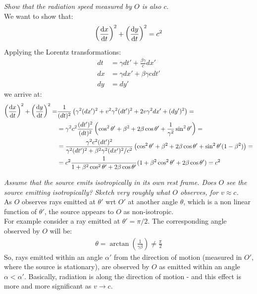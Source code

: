 \documentclass[../template.tex]{subfiles}
\begin{document}
\textit{Show that the radiation speed measured by $O$ is also $c$}.\\

We want to show that:
\begin{align*}
    \left(\dv{x}{t} \right)^2 + \left(\dv{y}{t} \right)^2 = c^2
\end{align*}
Applying the Lorentz transformations:
\begin{align*}
    dt &= \gamma dt' + \frac{\beta \gamma}{c} dx' \\
    dx &= \gamma dx' + \beta \gamma c dt' \\
    dy &= dy'
\end{align*}
we arrive at:
\begin{align*}
    \left(\dv{x}{t} \right)^2 + \left(\dv{y}{t} \right)^2 = &\frac{1}{(dt)^2} \left(\gamma^2 (dx')^2 + v^2 \gamma^2 (dt')^2 + 2v \gamma^2 dx' + (dy')^2\right) =\\
    &= \gamma^2 c^2 \frac{(dt')^2}{(dt)^2} \left(\cos^2\theta' + \beta^2 + 2 \beta \cos \theta' + \frac{1}{\gamma^2} \sin^2 \theta' \right) = \\
    &= \frac{\gamma^2 c^2 (dt')^2}{\gamma^2 (dt')^2 + \beta^2 \gamma^2 (dx')^2/c^2} \left( \cos^2 \theta' + \beta^2 + 2\beta \cos \theta' + \sin^2 \theta'(1-\beta^2)\right) = \\
    &= c^2 \frac{1}{1+\beta^2 \cos^2 \theta' + 2\beta \cos \theta'} (1+ \beta^2 \cos^2 \theta' + 2\beta\cos \theta') = c^2
\end{align*}

\textit{Assume that the source emits isotropically in its own rest frame. Does $O$ see the source emitting isotropically? Sketch very roughly what $O$ observes, for $v \approx c$.}\\

As $O$ observes rays emitted at $\theta'$ wrt $O'$ at another angle $\theta$, which is a non linear function of $\theta'$, the source appears to $O$ as non-isotropic.\\
For example consider a ray emitted at $\theta' = \pi/2$. The corresponding angle observed by $O$ will be:
\begin{align*}
    \theta = \arctan \left(\frac{1}{\gamma \beta} \right) \neq \frac{\pi}{2} 
\end{align*}  
So, rays emitted within an angle $\alpha'$ from the direction of motion (measured in $O'$, where the source is stationary), are observed by $O$ as emitted within an angle $\alpha < \alpha'$. Basically, radiation is  along the direction of motion - and this effect is more and more significant as $v \to c$.\\
\end{document}
